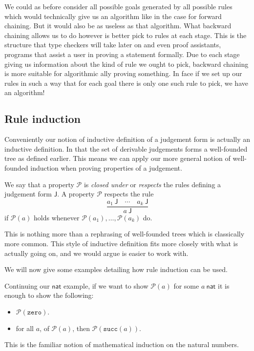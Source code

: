 \begin{remark}
    We could as before consider all possible goals generated by all possible rules which would technically give us an algorithm like in the case for forward chaining. But it would also be as useless as that algorithm. What backward chaining allows us to do however is better pick to rules at each stage. This is the structure that type checkers will take later on and even proof assistants, programs that assist a user in proving a statement formally. Due to each stage giving us information about the kind of rule we ought to pick, backward chaining is more suitable for algorithmic ally proving something. In face if we set up our rules in such a way that for each goal there is only one such rule to pick, we have an algorithm!
\end{remark}

\subsection{Rule induction}

Conveniently our notion of inductive definition of a judgement form is actually an inductive definition. In that the set of derivable judgements forms a well-founded tree as defined earlier. This means we can apply our more general notion of well-founded induction when proving properties of a judgement.

\begin{defin}
    We say that a property $\mathcal{P}$ is \emph{closed under} or \emph{respects} the rules defining a judgement form $\mathsf{J}$. A property $\mathcal{P}$ respects the rule
    $$
        \frac
        {a_1\ \mathsf{J}\quad \cdots \quad a_k\ \mathsf{J}}
        {a \ \mathsf{J}}
    $$
    if $\mathcal{P}(a)$ holds whenever $\mathcal{P}(a_1), \dots, \mathcal{P}(a_k)$ do.
\end{defin}

\begin{remark}
    This is nothing more than a rephrasing of well-founded trees which is classically more common. This style of inductive definition fits more closely with what is actually going on, and we would argue is easier to work with.
\end{remark}


We will now give some examples detailing how rule induction can be used.

\begin{example}
    Continuing our $\mathsf{nat}$ example, if we want to show $\mathcal{P}(a)$ for some $a\ \mathsf{nat}$ it is enough to show the following:
    \begin{itemize}
        \item $\mathcal{P}(\texttt{zero})$.
        \item for all $a$, of $\mathcal{P}(a)$, then $\mathcal{P}(\texttt{succ}(a))$.
    \end{itemize}
    
    This is the familiar notion of mathematical induction on the natural numbers.
\end{example}

